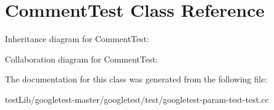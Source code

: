 \hypertarget{classCommentTest}{}\section{Comment\+Test Class Reference}
\label{classCommentTest}


Inheritance diagram for Comment\+Test\+:


Collaboration diagram for Comment\+Test\+:


The documentation for this class was generated from the following file\+:\begin{DoxyCompactItemize}
\item 
test\+Lib/googletest-\/master/googletest/test/googletest-\/param-\/test-\/test.\+cc\end{DoxyCompactItemize}

